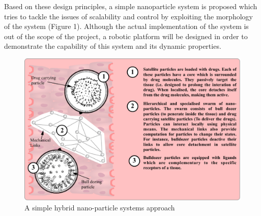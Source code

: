 \documentclass[11pt,a4paper]{article}
\begin{document}
\begin{multicols}{2}
Based on these design principles, a simple nanoparticle system is proposed which tries to tackle the issues of scalability and control by exploiting the morphology of the system (Figure 1). Although the actual implementation of the system is out of the scope of the project, a robotic platform will be designed in order to demonstrate the capability of this system and its dynamic properties.

\end{multicols}


\newpage
\begin{figure}[htbp]
\centering
\includegraphics{images/Figure1.pdf}
\caption{A simple hybrid nano-particle systems approach}
\end{figure}
\end{document}
